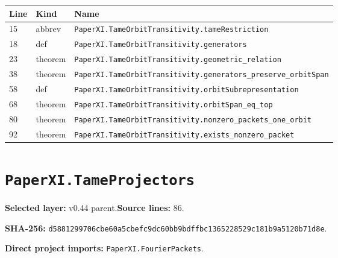 \documentclass[10pt,oneside]{book}
\begin{document}
\begin{longtable}{@{}p{}p{}p{}@{}}\toprule Line&Kind&Name\\\midrule\endhead

15&abbrev&\nolinkurl{PaperXI.TameOrbitTransitivity.tameRestriction}\\

18&def&\nolinkurl{PaperXI.TameOrbitTransitivity.generators}\\

23&theorem&\nolinkurl{PaperXI.TameOrbitTransitivity.geometric_relation}\\

38&theorem&\nolinkurl{PaperXI.TameOrbitTransitivity.generators_preserve_orbitSpan}\\

58&def&\nolinkurl{PaperXI.TameOrbitTransitivity.orbitSubrepresentation}\\

68&theorem&\nolinkurl{PaperXI.TameOrbitTransitivity.orbitSpan_eq_top}\\

80&theorem&\nolinkurl{PaperXI.TameOrbitTransitivity.nonzero_packets_one_orbit}\\

92&theorem&\nolinkurl{PaperXI.TameOrbitTransitivity.exists_nonzero_packet}\\

\bottomrule\end{longtable}

\section{\texorpdfstring{\nolinkurl{PaperXI.TameProjectors}}{PaperXI.TameProjectors}}\label{module:PaperXI.TameProjectors}

\textbf{Selected layer:} v0.44 parent.\quad\textbf{Source lines:} 86.\par\textbf{SHA-256:} {\scriptsize\nolinkurl{d5881299706cbe60a5cbefc9dc60bb9bdffbc1365228529c181b9a5120b71d8e}}.


\textbf{Direct project imports:} \nolinkurl{PaperXI.FourierPackets}.
\end{document}
